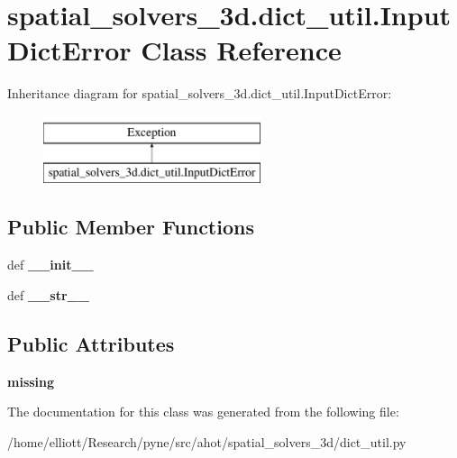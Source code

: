 \hypertarget{classspatial__solvers__3d_1_1dict__util_1_1_input_dict_error}{\section{spatial\-\_\-solvers\-\_\-3d.\-dict\-\_\-util.\-Input\-Dict\-Error Class Reference}
\label{classspatial__solvers__3d_1_1dict__util_1_1_input_dict_error}
}
Inheritance diagram for spatial\-\_\-solvers\-\_\-3d.\-dict\-\_\-util.\-Input\-Dict\-Error\-:\begin{figure}[H]
\begin{center}
\leavevmode
\includegraphics[height=2.000000cm]{classspatial__solvers__3d_1_1dict__util_1_1_input_dict_error}
\end{center}
\end{figure}
\subsection*{Public Member Functions}
\begin{DoxyCompactItemize}
\item 
\hypertarget{classspatial__solvers__3d_1_1dict__util_1_1_input_dict_error_a4966aa45d3b7fcb3d79a43b3d953d045}{def {\bfseries \-\_\-\-\_\-init\-\_\-\-\_\-}}\label{classspatial__solvers__3d_1_1dict__util_1_1_input_dict_error_a4966aa45d3b7fcb3d79a43b3d953d045}

\item 
\hypertarget{classspatial__solvers__3d_1_1dict__util_1_1_input_dict_error_af8d1148093139cb9f5ee4b154d3c0835}{def {\bfseries \-\_\-\-\_\-str\-\_\-\-\_\-}}\label{classspatial__solvers__3d_1_1dict__util_1_1_input_dict_error_af8d1148093139cb9f5ee4b154d3c0835}

\end{DoxyCompactItemize}
\subsection*{Public Attributes}
\begin{DoxyCompactItemize}
\item 
\hypertarget{classspatial__solvers__3d_1_1dict__util_1_1_input_dict_error_ac3622f01f73069150dcad765d8f9bd81}{{\bfseries missing}}\label{classspatial__solvers__3d_1_1dict__util_1_1_input_dict_error_ac3622f01f73069150dcad765d8f9bd81}

\end{DoxyCompactItemize}


The documentation for this class was generated from the following file\-:\begin{DoxyCompactItemize}
\item 
/home/elliott/\-Research/pyne/src/ahot/spatial\-\_\-solvers\-\_\-3d/dict\-\_\-util.\-py\end{DoxyCompactItemize}
